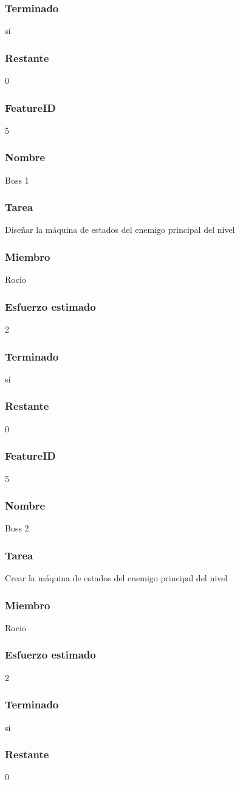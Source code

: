 \subsubsection{Terminado} sí
\subsubsection{Restante} 0

\subsubsection{FeatureID} 5
\subsubsection{Nombre} Boss 1
\subsubsection{Tarea} Diseñar la máquina de estados del enemigo principal del nivel
\subsubsection{Miembro} Rocio
\subsubsection{Esfuerzo estimado} 2
\subsubsection{Terminado} sí
\subsubsection{Restante} 0

\subsubsection{FeatureID} 5
\subsubsection{Nombre} Boss 2
\subsubsection{Tarea} Crear la máquina de estados del enemigo principal del nivel
\subsubsection{Miembro} Rocio
\subsubsection{Esfuerzo estimado} 2
\subsubsection{Terminado} sí
\subsubsection{Restante} 0

